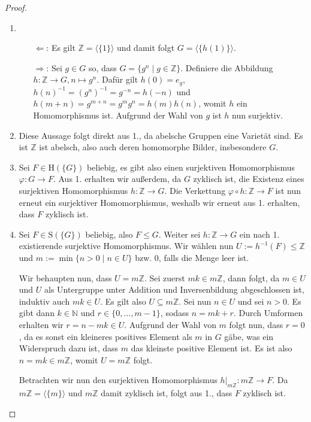 \begin{proof} {\ }
    \begin{enumerate}
        \item \begin{itemize}
            \item[$\Leftarrow$:] Es gilt $\mathbb{Z}=\langle \{1\} \rangle$ und damit folgt $G=\langle \{h(1)\} \rangle$.
            \item[$\Rightarrow$:] Sei $g \in G$ so, dass $G = \{g^n \mid g \in \mathbb{Z}\} $. Definiere die Abbildung $h: \mathbb{Z} \to G, n \mapsto g^n$. Dafür gilt $h(0) = e_g$, $h(n)^{-1} = (g^{n})^{-1} = g^{-n} = h(-n)$ und $h(m+n) = g^{m+n} = g^m g^n = h(m)h(n)$, womit $h$ ein Homomorphismus ist. Aufgrund der Wahl von $g$ ist $h$ nun surjektiv.
        \end{itemize}
        \item Diese Aussage folgt direkt aus 1., da abelsche Gruppen eine Varietät sind. Es ist $\mathbb{Z}$ ist abelsch, also auch deren homomorphe Bilder, insbesondere $G$.
        \item Sei $F \in \mathrm{H}(\{G\})$ beliebig, es gibt also einen surjektiven Homomorphismus $\varphi: G \to F$. Aus 1. erhalten wir außerdem, da $G$ zyklisch ist, die Existenz eines surjektiven Homomorphismus $h: \mathbb{Z} \to G$. Die Verkettung $\varphi \circ h: \mathbb{Z} \to F$ ist nun erneut ein surjektiver Homomorphismus, weshalb wir erneut aus 1. erhalten, dass $F$ zyklisch ist.
        \item Sei $F \in \mathrm{S}(\{G\})$ beliebig, also $F \le G$. Weiter sei $h: \mathbb{Z} \to G$ ein nach 1. existierende surjektive Homomorphismus.
        Wir wählen nun $U := h^{-1}(F) \le \mathbb{Z}$ und $m := \min\{n > 0 \mid n \in U\}$ bzw. $0$, falls die Menge leer ist. 
        
        Wir behaupten nun, dass $U = m \mathbb{Z}$. Sei zuerst $mk \in m\mathbb{Z}$, dann folgt, da $m \in U$ und $U$ als Untergruppe unter Addition und Inversenbildung abgeschlossen ist, induktiv auch $mk \in U$. Es gilt also $U \subseteq m\mathbb{Z}$. Sei nun $n \in U$ und sei \obda $n > 0$. Es gibt dann $k \in \mathbb{N}$ und $r \in \{0, \ldots, m-1\}$, sodass $n = mk+r$. Durch Umformen erhalten wir $r = n - mk \in U$. Aufgrund der Wahl von $m$ folgt nun, dass $r = 0$, da es sonst ein kleineres positives Element als $m$ in $G$ gäbe, was ein Widerspruch dazu ist, dass $m$ das kleinste positive Element ist. Es ist also $n = mk \in m\mathbb{Z}$, womit $U = m\mathbb{Z}$ folgt.

        Betrachten wir nun den surjektiven Homomorphismus $h\vert_{m\mathbb{Z}}: m\mathbb{Z} \to F$. Da $m\mathbb{Z} = \langle\{m\}\rangle$ und $m\mathbb{Z}$ damit zyklisch ist, folgt aus 1., dass $F$ zyklisch ist.
    \end{enumerate}
\end{proof}


